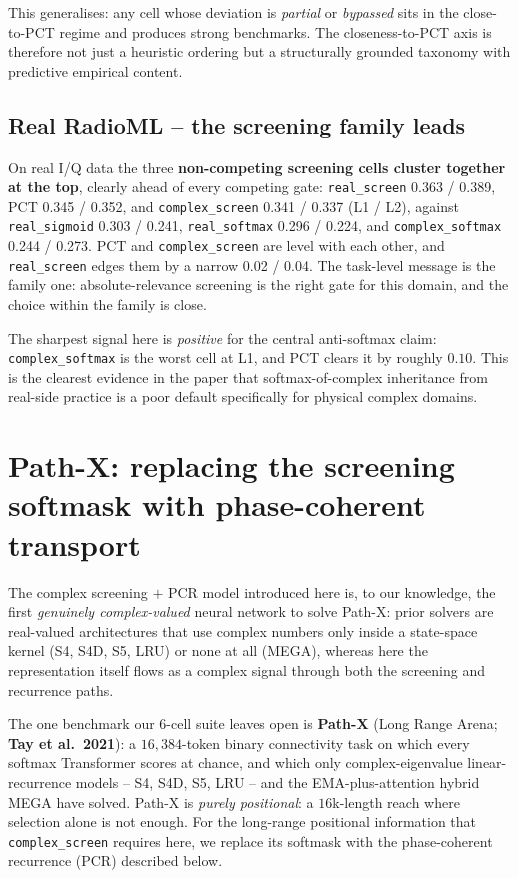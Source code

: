 \documentclass[11pt,a4paper]{article}
\theoremstyle{plain}
\theoremstyle{definition}
\begin{document}
This generalises: any cell whose deviation is \emph{partial} or \emph{bypassed} sits in the close-to-PCT regime and produces strong benchmarks. The closeness-to-PCT axis is therefore not just a heuristic ordering but a structurally grounded taxonomy with predictive empirical content.

\subsection{Real RadioML -- the screening family leads}
On real I/Q data the three \textbf{non-competing screening cells cluster together at the top}, clearly ahead of every competing gate: \texttt{real\_screen} 0.363 / 0.389, PCT 0.345 / 0.352, and \texttt{complex\_screen} 0.341 / 0.337 (L1 / L2), against \texttt{real\_sigmoid} 0.303 / 0.241, \texttt{real\_softmax} 0.296 / 0.224, and \texttt{complex\_softmax} 0.244 / 0.273. PCT and \texttt{complex\_screen} are level with each other, and \texttt{real\_screen} edges them by a narrow 0.02 / 0.04. The task-level message is the family one: absolute-relevance screening is the right gate for this domain, and the choice within the family is close.

The sharpest signal here is \emph{positive} for the central anti-softmax claim: \texttt{complex\_softmax} is the worst cell at L1, and PCT clears it by roughly $0.10$. This is the clearest evidence in the paper that softmax-of-complex inheritance from real-side practice is a poor default specifically for physical complex domains.

\medskip

\section{Path-X: replacing the screening softmask with phase-coherent transport}

The complex screening $+$ PCR model introduced here is, to our knowledge, the
first \emph{genuinely complex-valued} neural network to solve Path-X: prior
solvers are real-valued architectures that use complex numbers only inside a
state-space kernel (S4, S4D, S5, LRU) or none at all (MEGA), whereas here the
representation itself flows as a complex signal through both the screening and
recurrence paths.

The one benchmark our 6-cell suite leaves open is \textbf{Path-X} (Long Range
Arena; \textbf{Tay et al.\ 2021}): a $16{,}384$-token binary connectivity task
on which every softmax Transformer scores at chance, and which only
complex-eigenvalue linear-recurrence models -- S4, S4D, S5, LRU -- and the
EMA-plus-attention hybrid MEGA have solved. Path-X is \emph{purely positional}:
a $16$k-length reach where selection alone is not enough. For the long-range
positional information that \texttt{complex\_screen} requires here, we replace
its softmask with the phase-coherent recurrence (PCR) described below.
\end{document}
